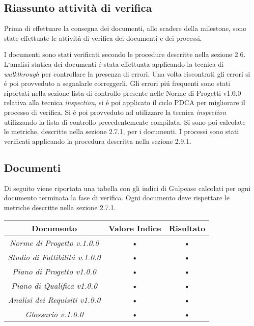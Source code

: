 \subsection{Riassunto attività di verifica}

Prima di effettuare la consegna dei documenti, allo scadere della milestone, sono state effettuate le attività di verifica dei documenti e dei processi.

I documenti sono stati verificati secondo le procedure descritte nella sezione 2.6.
L`analisi statica dei documenti \'e stata effettuata applicando la tecnica di \textit{walkthrough} per controllare la presenza di errori. Una volta riscontrati gli errori si \'e poi provveduto a segnalarle correggerli. Gli errori pi\'u frequenti sono stati riportati nella sezione lista di controllo presente nelle Norme di Progetti v1.0.0 relativa alla tecnica \textit{inspection}, si \'e poi applicato il ciclo PDCA per migliorare il processo di verifica.
Si \'e poi provveduto ad utilizzare la tecnica \textit{inspection} utilizzando la lista di controllo precedentemente compilata.
Si sono poi calcolate le metriche, descritte nella sezione 2.7.1, per i documenti.
I processi sono stati verificati applicando la procedura descritta nella sezione 2.9.1.

\subsection{Documenti}

Di seguito viene riportata una tabella con gli indici di Gulpease calcolati per ogni documento terminata la fase di verifica.
Ogni documento deve rispettare le metriche descritte nella sezione 2.7.1.\\

\hspace{1cm}

\begin{center}
\begin{tabular}{|c|c|c|}
\hline 
\textbf{Documento} & \textbf{Valore Indice} & \textbf{Risultato} \\ 
\hline
\textit{Norme di Progetto v.1.0.0} & • & • \\ 
\textit{Studio di Fattibilit\'a v.1.0.0} & • & • \\ 
\textit{Piano di Progetto v1.0.0} & • & • \\ 
\textit{Piano di Qualifica v1.0.0} & • & • \\ 
\textit{Analisi dei Requisiti v1.0.0} & • & • \\ 
\textit{Glossario v.1.0.0} & • & • \\ 
\hline 
\end{tabular} 

\end{center}
